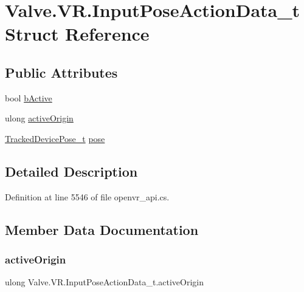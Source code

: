 \hypertarget{struct_valve_1_1_v_r_1_1_input_pose_action_data__t}{}\section{Valve.\+V\+R.\+Input\+Pose\+Action\+Data\+\_\+t Struct Reference}
\label{struct_valve_1_1_v_r_1_1_input_pose_action_data__t}
\subsection*{Public Attributes}
\begin{DoxyCompactItemize}
\item 
bool \mbox{\hyperlink{struct_valve_1_1_v_r_1_1_input_pose_action_data__t_a77309f1d87343c309533c9a73ccb06ba}{b\+Active}}
\item 
ulong \mbox{\hyperlink{struct_valve_1_1_v_r_1_1_input_pose_action_data__t_a63c8cb98ea34c5cf2183ddf90c629747}{active\+Origin}}
\item 
\mbox{\hyperlink{struct_valve_1_1_v_r_1_1_tracked_device_pose__t}{Tracked\+Device\+Pose\+\_\+t}} \mbox{\hyperlink{struct_valve_1_1_v_r_1_1_input_pose_action_data__t_a33ada94bf8bfabf5b91c6b14d65d285c}{pose}}
\end{DoxyCompactItemize}


\subsection{Detailed Description}


Definition at line 5546 of file openvr\+\_\+api.\+cs.



\subsection{Member Data Documentation}
\mbox{\label{struct_valve_1_1_v_r_1_1_input_pose_action_data__t_a63c8cb98ea34c5cf2183ddf90c629747}} 
\subsubsection{\texorpdfstring{activeOrigin}{activeOrigin}}
{\footnotesize\ttfamily ulong Valve.\+V\+R.\+Input\+Pose\+Action\+Data\+\_\+t.\+active\+Origin}



